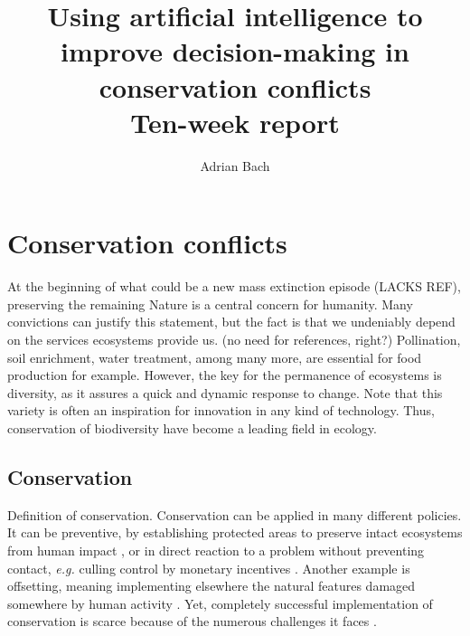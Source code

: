 \documentclass[12pt,a4paper]{article}
\author{Adrian Bach}
\title{Using artificial intelligence to improve decision-making in conservation conflicts \\\medskip Ten-week report}
\begin{document}
\maketitle

\tableofcontents

\newpage
\section{Conservation conflicts}

At the beginning of what could be a new mass extinction episode (LACKS REF), preserving the remaining Nature is a central concern for humanity.
Many convictions can justify this statement, but the fact is that we undeniably depend on the services ecosystems provide us. (no need for references, right?)
Pollination, soil enrichment, water treatment, among many more, are essential for food production for example.
However, the key for the permanence of ecosystems is diversity, as it assures a quick and dynamic response to change.
Note that this variety is often an inspiration for innovation in any kind of technology.
Thus, conservation of biodiversity have become a leading field in ecology.
%

\subsection{Conservation}

Definition of conservation.
Conservation can be applied in many different policies.
It can be preventive, by establishing protected areas to preserve intact ecosystems from human impact \citep{vanwilgen2011critical, brainbridge2017goose},
or in direct reaction to a problem without preventing contact, \textit{e.g.} culling control by monetary incentives \citep{mason2017changing, cusack2017time}.
Another example is offsetting, meaning implementing elsewhere the natural features damaged somewhere by human activity \citep{gordon2011assessing}.
Yet, completely successful implementation of conservation is scarce because of the numerous challenges it faces \citep{walters2011uncertainty, wilgen2011critical}.
\end{document}
